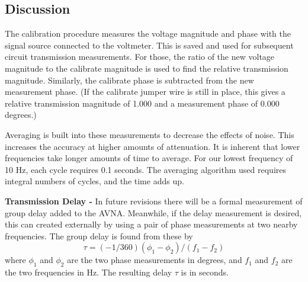 %
\subsection{Discussion}
\label{subsect:TDiscus}
The calibration procedure measures the voltage magnitude and phase with the signal source connected to the voltmeter.  This is saved and used for subsequent  circuit transmission measurements.  For those, the ratio of the new voltage magnitude to the calibrate magnitude is used to find the relative transmission magnitude.  Similarly, the calibrate phase is subtracted from the new measurement phase.  (If the calibrate jumper wire is still in place, this gives a relative transmission magnitude of 1.000 and a measurement phase of 0.000 degrees.)

Averaging is built into these measurements to decrease the effects of noise.  This increases the accuracy at higher amounts of attenuation.  It is inherent that lower frequencies take longer amounts of time to average.  For our lowest frequency of 10 Hz, each cycle requires 0.1 seconds.  The averaging algorithm used requires integral numbers of cycles, and the time adds up.

\textbf{Transmission Delay - }In future revisions there will be a formal measurement of group delay added to the AVNA.  Meanwhile, if the delay measurement is desired, this can created externally by using a pair of phase measurements at two nearby frequencies.  The group delay is found from these by
\begin{equation}
\tau=(-1/360)(\phi_1-\phi_2)/(f_1-f_2)
\end{equation}
where $\phi_1$ and $\phi_2$ are the two phase measurements in degrees, and $f_1$ and $f_2$ are the two frequencies in Hz.  The resulting delay $\tau$ is in seconds.
